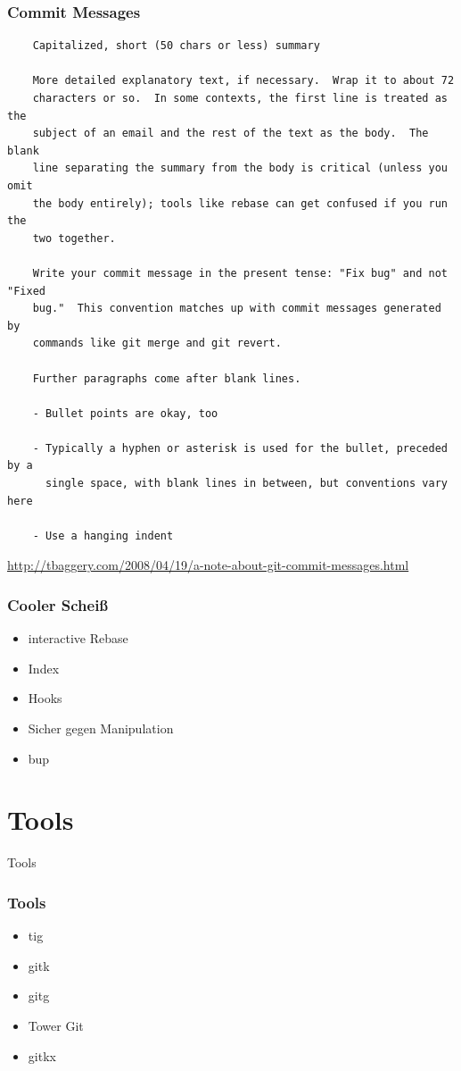 \documentclass[]{beamer}
\begin{document}
\begin{frame}[fragile]
	\frametitle{Commit Messages}
	\fontsize{8}{8}\selectfont
	\begin{verbatim}
	Capitalized, short (50 chars or less) summary

	More detailed explanatory text, if necessary.  Wrap it to about 72
	characters or so.  In some contexts, the first line is treated as the
	subject of an email and the rest of the text as the body.  The blank
	line separating the summary from the body is critical (unless you omit
	the body entirely); tools like rebase can get confused if you run the
	two together.

	Write your commit message in the present tense: "Fix bug" and not "Fixed
	bug."  This convention matches up with commit messages generated by
	commands like git merge and git revert.

	Further paragraphs come after blank lines.

	- Bullet points are okay, too

	- Typically a hyphen or asterisk is used for the bullet, preceded by a
	  single space, with blank lines in between, but conventions vary here

	- Use a hanging indent
	\end{verbatim}
	\url{http://tbaggery.com/2008/04/19/a-note-about-git-commit-messages.html}
\end{frame}

\begin{frame}
	\frametitle{Cooler Scheiß\texttrademark}
	\begin{itemize}
		\item
			interactive Rebase
		\item
			Index
		\item
			Hooks
		\item
			Sicher gegen Manipulation
		\item
			bup
	\end{itemize}
\end{frame}

\section{Tools}
\begin{frame}
	\fontsize{30}{10}\selectfont Tools
\end{frame}

\begin{frame}
	\frametitle{Tools}
	\begin{itemize}
		\item
			tig
		\item
			gitk
		\item
			gitg
		\item
			Tower Git
		\item
			gitkx
	\end{itemize}
\end{frame}
\end{document}
